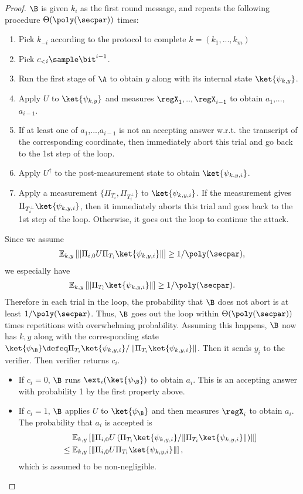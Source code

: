 \begin{proof}
$\B$ is given $k_i$ as the first round message, and repeats the following procedure $\Theta(\poly(\secpar))$ times:
\begin{enumerate}
\item Pick $k_{-i}$ according to the protocol to complete $k=(k_1,...,k_m)$
\item Pick $c_{<i}\sample \bit^{i-1}$.
\item Run the first stage of $\A$ to obtain $y$ along with its internal state $\ket{\psi_{k,y}}$.
\item Apply $U$ to $\ket{\psi_{k,y}}$ and measures $\regX_1,..,\regX_{i-1}$ to obtain $a_{1}$,...,$a_{i-1}$.
\item If at least one of $a_1$,...,$a_{i-1}$ is not an accepting answer w.r.t. the transcript of the corresponding coordinate, then immediately abort this trial and go back to the 1st step of the loop. 
\item Apply $U^{\dagger}$ to the post-measurement state to obtain $\ket{\psi_{k,y,i}}$.
\item Apply a measurement $\{\Pi_{T_i},\Pi_{T_i^{\bot}}\}$ to $\ket{\psi_{k,y,i}}$. 
If the measurement gives  $\Pi_{T_i^{\bot}}\ket{\psi_{k,y,i}}$, then it immediately aborts this trial and goes back to the 1st step of the loop. Otherwise, it goes out the loop to continue the attack.
\end{enumerate}
Since we assume \begin{align*}
   \mathbb{E}_{k,y}\left[\left\|\Pi_{i,0}U\Pi_{T_i}\ket{\psi_{k,y,i}}\right\|\right]\geq 1/\poly(\secpar),
\end{align*}
we especially have 
\begin{align*}
   \mathbb{E}_{k,y}\left[\left\|\Pi_{T_i}\ket{\psi_{k,y,i}}\right\|\right]\geq 1/\poly(\secpar).    
\end{align*}
Therefore in each trial in the loop, the probability that $\B$ does not abort is at least $1/\poly(\secpar)$. 
Thus, $\B$ goes out the loop within $\Theta(\poly(\secpar))$ times repetitions with overwhelming probability.
Assuming this happens, $\B$ now has $k,y$ along with the corresponding state $\ket{\psi_{\B}}\defeq \Pi_{T_i}\ket{\psi_{k,y,i}}/\left\|\Pi_{T_i}\ket{\psi_{k,y,i}}\right\|$.
Then it sends $y_i$ to the verifier.
Then verifier returns $c_i$.
\begin{itemize}
\item If $c_i=0$, $\B$ runs $\ext_i(\ket{\psi_{\B}})$ to obtain $a_i$. This is an accepting answer with probability 1 by the first property above.
\item If $c_i=1$, $\B$ applies $U$ to  $\ket{\psi_{\B}}$ and then measures $\regX_i$ to obtain $a_i$. The probability that $a_i$ is accepted is 
\begin{align*}
   &~~~~\mathbb{E}_{k,y}\left[\left\|\Pi_{i,0}U\left(\Pi_{T_i}\ket{\psi_{k,y,i}}/\|\Pi_{T_i}\ket{\psi_{k,y,i}}\|\right)\right\|\right]\\
    &\leq \mathbb{E}_{k,y}\left[\left\|\Pi_{i,0}U\Pi_{T_i}\ket{\psi_{k,y,i}}\right\|\right],
\end{align*}
which is assumed to be non-negligible.


\end{itemize}
\end{proof}
